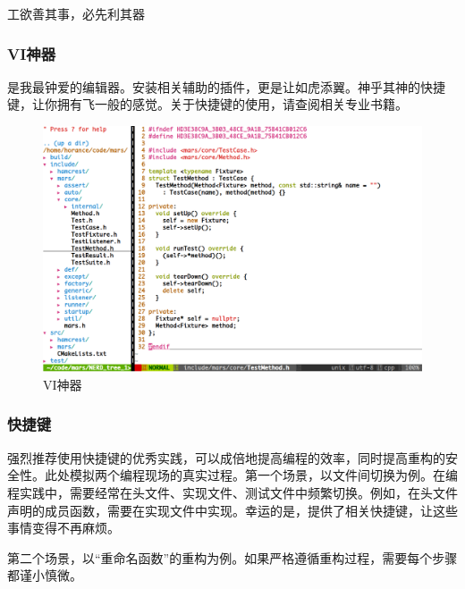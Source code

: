 \begin{content}
\begin{episode}{工欲善其事，必先利其器}
\begin{content}
\subsubsection{VI神器}

是我最钟爱的编辑器。安装相关辅助的插件，更是让如虎添翼。神乎其神的快捷键，让你拥有飞一般的感觉。关于快捷键的使用，请查阅相关专业书籍。

\begin{figure}[H]
\centering
\includegraphics[width=1.0\textwidth]{figures/xunit/vi.png}
\caption{VI神器}
 \label{fig:vi-editor}
\end{figure}

\subsubsection{快捷键}

强烈推荐使用快捷键的优秀实践，可以成倍地提高编程的效率，同时提高重构的安全性。此处模拟两个编程现场的真实过程。第一个场景，以文件间切换为例。在编程实践中，需要经常在头文件、实现文件、测试文件中频繁切换。例如，在头文件声明的成员函数，需要在实现文件中实现。幸运的是，提供了相关快捷键，让这些事情变得不再麻烦。

\begin{enum}
\end{enum}

第二个场景，以“重命名函数”的重构为例。如果严格遵循重构过程，需要每个步骤都谨小慎微。


\end{content}
\end{episode}
\end{content}
